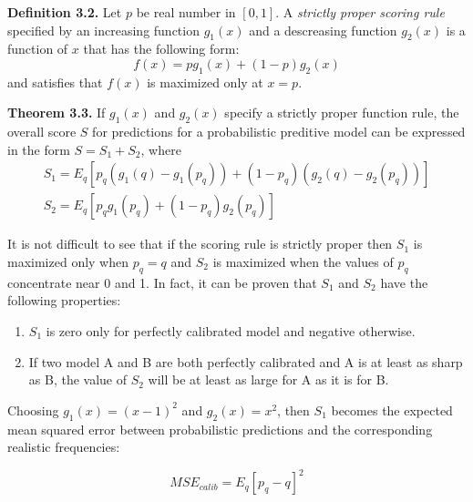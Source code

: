 \textbf{Definition 3.2.} Let $p$ be real number in $[0, 1]$. A \textit{strictly proper scoring rule} specified by an increasing function $g_1(x)$ and a descreasing function $g_2(x)$ is a function of $x$ that has the following form:
\begin{equation}
    \displaystyle f(x) = pg_1(x) + (1 - p)g_2(x)
    \label{eqn:proper_rule}
\end{equation}
and satisfies that $f(x)$ is maximized only at $x = p$.

\textbf{Theorem 3.3.} If $g_1(x)$ and $g_2(x)$ specify a strictly proper function rule, the overall score $S$ for predictions for a probabilistic preditive model can be expressed in the form $S = S_1 + S_2$, where
\begin{equation}    
  \begin{array}{l}
    S_1 = E_{q}[p_q(g_1(q) - g_1(p_q)) + (1 - p_q)(g_2(q) - g_2(p_q))] \\ 
    S_2 = E_{q}[p_qg_1(p_q) + (1 - p_q)g_2(p_q)]
  \end{array}
  \label{eqn:general_metric}
\end{equation}

It is not difficult to see that if the scoring rule is strictly proper then $S_1$ is maximized only when $p_q = q$ and $S_2$ is maximized when the values of $p_q$ concentrate near 0 and 1. In fact, it can be proven that $S_1$ and $S_2$ have the following properties: 
\begin{enumerate}
  \item $S_1$ is zero only for perfectly calibrated model and negative otherwise.
  \item If two model A and B are both perfectly calibrated and A is at least as sharp as B, the value of $S_2$ will be at least as large for A as it is for B.
\end{enumerate}

Choosing $g_1(x) = (x - 1)^2$ and $g_2(x) = x^2$, then $S_1$ becomes the expected mean squared error between probabilistic predictions and the corresponding realistic frequencies:

$$MSE_{calib} = E_{q}[p_q - q]^2$$


